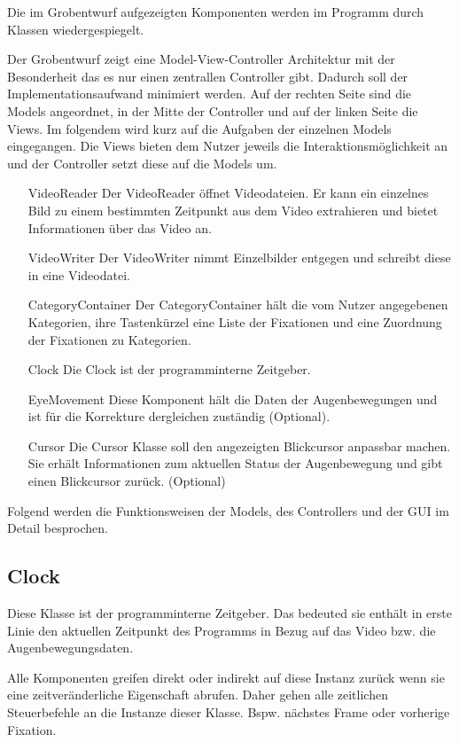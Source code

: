 \documentclass[a4paper,draft]{scrartcl}
\begin{document}
  Die im Grobentwurf aufgezeigten Komponenten werden im Programm durch Klassen wiedergespiegelt.
  
  Der Grobentwurf zeigt eine Model-View-Controller Architektur mit der Besonderheit das es nur einen zentrallen Controller gibt. Dadurch soll der Implementationsaufwand minimiert werden. Auf der rechten Seite sind die Models angeordnet, in der Mitte der Controller und auf der linken Seite die Views. Im folgendem wird kurz auf die Aufgaben der einzelnen Models eingegangen. Die Views bieten dem Nutzer jeweils die Interaktionsmöglichkeit an und der Controller setzt diese auf die Models um.

  \begin{enumerate}
    \item[VideoReader] Der VideoReader öffnet Videodateien. Er kann ein einzelnes Bild zu einem bestimmten Zeitpunkt aus dem Video extrahieren und bietet Informationen über das Video an.
    \item[VideoWriter] Der VideoWriter nimmt Einzelbilder entgegen und schreibt diese in eine Videodatei.
    \item[CategoryContainer] Der CategoryContainer hält die vom Nutzer angegebenen Kategorien, ihre Tastenkürzel eine Liste der Fixationen und eine Zuordnung der Fixationen zu Kategorien.
    \item[Clock] Die Clock ist der programminterne Zeitgeber.
    \item[EyeMovement] Diese Komponent hält die Daten der Augenbewegungen und ist für die Korrekture dergleichen zuständig (Optional).
    \item[Cursor] Die Cursor Klasse soll den angezeigten Blickcursor anpassbar machen. Sie erhält Informationen zum aktuellen Status der Augenbewegung und gibt einen Blickcursor zurück. (Optional)
  \end{enumerate}

Folgend werden die Funktionsweisen der Models, des Controllers und der GUI im Detail besprochen.

\subsection{Clock}
Diese Klasse ist der programminterne Zeitgeber. 
Das bedeuted sie enth\"alt in erste Linie den aktuellen Zeitpunkt des Programms in Bezug auf das Video bzw. die Augenbewegungsdaten.

Alle Komponenten greifen direkt oder indirekt auf diese Instanz zur\"uck wenn sie eine zeitver\"anderliche Eigenschaft abrufen. Daher gehen alle zeitlichen Steuerbefehle an die Instanze dieser Klasse. Bspw. n\"achstes Frame oder vorherige Fixation.
\end{document}
